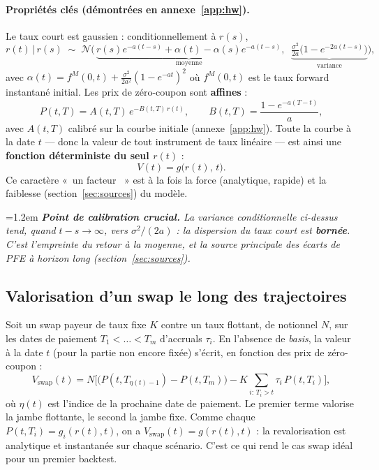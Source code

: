 \documentclass[11pt,a4paper]{article}
\providecommand{\og}{«~}
\providecommand{\fg}{~»}
\newenvironment{remarque}
  {\par\smallskip\noindent\begin{minipage}{\linewidth}\leftskip=1.2em
   \footnotesize\itshape}
  {\end{minipage}\par\smallskip}
\theoremstyle{remark}
\begin{document}
\paragraph{Propriétés clés (démontrées en annexe~\ref{app:hw}).} Le taux court est gaussien : conditionnellement à $r(s)$,
\begin{equation}
r(t)\,\big|\,r(s) \;\sim\; \mathcal{N}\!\Big(\,\underbrace{r(s)e^{-a(t-s)} + \alpha(t) - \alpha(s)e^{-a(t-s)}}_{\text{moyenne}},\;\; \underbrace{\tfrac{\sigma^2}{2a}\big(1-e^{-2a(t-s)}\big)}_{\text{variance}}\Big),
\end{equation}
avec $\alpha(t) = f^{M}(0,t) + \frac{\sigma^2}{2a^2}(1-e^{-at})^2$ où $f^{M}(0,t)$ est le taux forward instantané initial. Les prix de zéro-coupon sont \textbf{affines} :
\begin{equation}
P(t,T) = A(t,T)\,e^{-B(t,T)\,r(t)}, \qquad B(t,T) = \frac{1 - e^{-a(T-t)}}{a},
\end{equation}
avec $A(t,T)$ calibré sur la courbe initiale (annexe~\ref{app:hw}). Toute la courbe à la date $t$ --- donc la valeur de tout instrument de taux linéaire --- est ainsi une \textbf{fonction déterministe du seul $r(t)$} :
\begin{equation}
V(t) = g\big(r(t),\, t\big).
\end{equation}
Ce caractère \og un facteur \fg{} est à la fois la force (analytique, rapide) et la faiblesse (section~\ref{sec:sources}) du modèle.

\begin{remarque}
\textbf{Point de calibration crucial.} La variance conditionnelle ci-dessus tend, quand $t-s\to\infty$, vers $\sigma^2/(2a)$ : la dispersion du taux court est \textbf{bornée}. C'est l'empreinte du retour à la moyenne, et la source principale des écarts de PFE à horizon long (section~\ref{sec:sources}).
\end{remarque}

\subsection{Valorisation d'un swap le long des trajectoires}

Soit un swap payeur de taux fixe $K$ contre un taux flottant, de notionnel $N$, sur les dates de paiement $T_1 < \dots < T_m$ d'accruals $\tau_i$. En l'absence de \emph{basis}, la valeur à la date $t$ (pour la partie non encore fixée) s'écrit, en fonction des prix de zéro-coupon :
\begin{equation}
V_{\text{swap}}(t) = N\Big[\big(P(t, T_{\eta(t)-1}) - P(t, T_m)\big) - K \!\!\sum_{i:\,T_i > t}\!\! \tau_i\, P(t, T_i)\Big],
\end{equation}
où $\eta(t)$ est l'indice de la prochaine date de paiement. Le premier terme valorise la jambe flottante, le second la jambe fixe. Comme chaque $P(t,T_i) = g_i(r(t),t)$, on a $V_{\text{swap}}(t) = g(r(t),t)$ : la revalorisation est analytique et instantanée sur chaque scénario. C'est ce qui rend le cas swap idéal pour un premier backtest.
\end{document}
